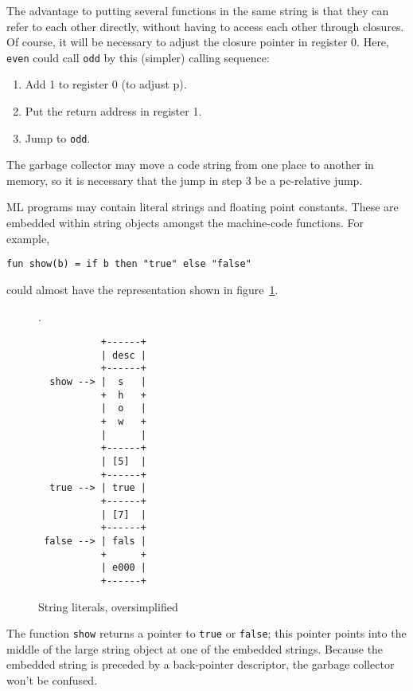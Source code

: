 The advantage to putting several functions in the same string is that
they can refer to each other directly, without having to access each
other through closures.  Of course, it will be necessary to adjust
the closure
pointer in register 0.  Here, \verb"even" could call \verb"odd"
by this (simpler) calling sequence:
\begin{enumerate}
\item Add 1 to register 0  (to adjust p).
\item Put the return address in register 1.
\item Jump to \verb"odd".
\end{enumerate}

The garbage collector may move a code string from one place to another
in memory, so it is necessary that the jump in step 3 be a 
pc-relative
jump.

ML programs may contain literal
strings and floating point constants.
These are embedded within string objects amongst the machine-code
functions.  For example,
\begin{verbatim}
fun show(b) = if b then "true" else "false"
\end{verbatim}
could almost have the representation shown in figure~\ref{embedded2}.
\begin{figure}[htbp]
\label{embedded2}.
\begin{verbatim}
           +------+
           | desc |
           +------+
  show --> |  s   |
           +  h   +
           |  o   |
           +  w   +
           |      |
           +------+
           | [5]  |
           +------+
  true --> | true |
           +------+
           | [7]  |
           +------+
 false --> | fals |
           +      +
           | e000 |
           +------+
\end{verbatim}
\caption{String literals, oversimplified}
\end{figure}
The function \verb"show" returns a pointer to \verb"true" or \verb"false";
this pointer points into the middle of the large string object at one
of the embedded strings.  Because the embedded string is preceded by a
back-pointer descriptor, the garbage collector won't be confused.

